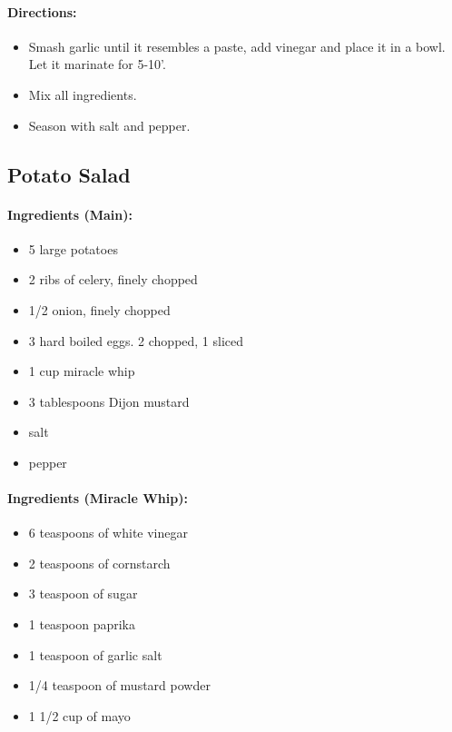 \documentclass{article}
\begin{document}
\paragraph{Directions:}
\begin{itemize}
    \item Smash garlic until it resembles a paste, add vinegar and place it in a bowl. Let it marinate for 5-10'.
    \item Mix all ingredients.
    \item Season with salt and pepper.
\end{itemize}

\subsection{Potato Salad} 

\paragraph{Ingredients (Main):}
\begin{itemize}
    \item 5 large potatoes
    \item 2 ribs of celery, finely chopped
    \item 1/2 onion, finely chopped
    \item 3 hard boiled eggs. 2 chopped, 1 sliced
    \item 1 cup miracle whip
    \item 3 tablespoons Dijon mustard
    \item salt
    \item pepper
\end{itemize}  

\paragraph{Ingredients (Miracle Whip):}
\begin{itemize}
    \item 6 teaspoons of white vinegar
    \item 2 teaspoons of cornstarch
    \item 3 teaspoon of sugar
    \item 1 teaspoon paprika
    \item 1 teaspoon of garlic salt
    \item 1/4 teaspoon of mustard powder
    \item 1 1/2 cup of mayo
\end{itemize}  
\end{document}
